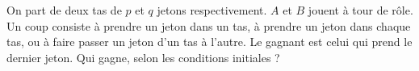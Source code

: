 On part de deux tas de $p$ et $q$ jetons respectivement. $A$ et $B$ jouent à tour de rôle. Un coup consiste à prendre un jeton dans un tas, à prendre un jeton dans chaque tas, ou à faire passer un jeton d'un tas à l'autre. Le gagnant est celui qui prend le dernier jeton. Qui gagne, selon les conditions initiales ?
